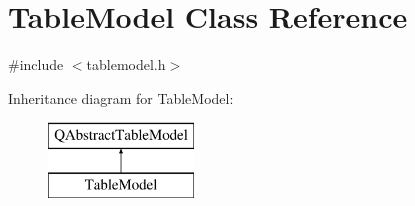 \hypertarget{class_table_model}{}\section{Table\+Model Class Reference}
\label{class_table_model}


{\ttfamily \#include $<$tablemodel.\+h$>$}

Inheritance diagram for Table\+Model\+:\begin{figure}[H]
\begin{center}
\leavevmode
\includegraphics[height=2.000000cm]{class_table_model}
\end{center}
\end{figure}
